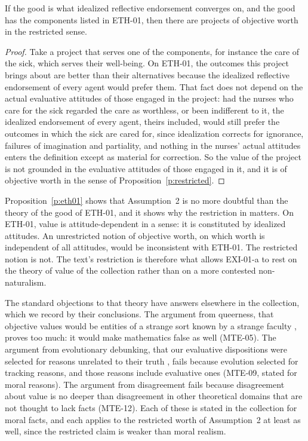 \begin{proposition}\label{p:eth01}
If the good is what idealized reflective endorsement converges on, and the good has the components listed in ETH-01, then there are projects of objective worth in the restricted sense.
\end{proposition}

\begin{proof}
Take a project that serves one of the components, for instance the care of the sick, which serves their well-being. On ETH-01, the outcomes this project brings about are better than their alternatives because the idealized reflective endorsement of every agent would prefer them. That fact does not depend on the actual evaluative attitudes of those engaged in the project: had the nurses who care for the sick regarded the care as worthless, or been indifferent to it, the idealized endorsement of every agent, theirs included, would still prefer the outcomes in which the sick are cared for, since idealization corrects for ignorance, failures of imagination and partiality, and nothing in the nurses' actual attitudes enters the definition except as material for correction. So the value of the project is not grounded in the evaluative attitudes of those engaged in it, and it is of objective worth in the sense of Proposition~\ref{p:restricted}.
\end{proof}

Proposition~\ref{p:eth01} shows that Assumption~2 is no more doubtful than the theory of the good of ETH-01, and it shows why the restriction in  matters. On ETH-01, value is attitude-dependent in a sense: it is constituted by idealized attitudes. An unrestricted notion of objective worth, on which worth is independent of all attitudes, would be inconsistent with ETH-01. The restricted notion is not. The text's restriction is therefore what allows EXI-01-a to rest on the theory of value of the collection rather than on a more contested non-naturalism.

The standard objections to that theory have answers elsewhere in the collection, which we record by their conclusions. The argument from queerness, that objective values would be entities of a strange sort known by a strange faculty \citep{Mackie1977}, proves too much: it would make mathematics false as well (MTE-05). The argument from evolutionary debunking, that our evaluative dispositions were selected for reasons unrelated to their truth \citep{Street2006}, fails because evolution selected for tracking reasons, and those reasons include evaluative ones (MTE-09, stated for moral reasons). The argument from disagreement fails because disagreement about value is no deeper than disagreement in other theoretical domains that are not thought to lack facts (MTE-12). Each of these is stated in the collection for moral facts, and each applies to the restricted worth of Assumption~2 at least as well, since the restricted claim is weaker than moral realism.

